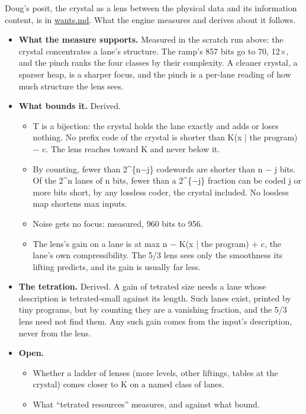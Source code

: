 Doug's posit, the crystal as a lens between the physical data and its information content, is in \hyperref[chap:wants]{wants.md}. What the engine measures and derives about it follows.

\begin{itemize}
\item \textbf{What the measure supports.} Measured in the scratch run above: the crystal concentrates a lane's structure. The ramp's 857 bits go to 70, 12×, and the pinch ranks the four classes by their complexity. A cleaner crystal, a sparser heap, is a sharper focus, and the pinch is a per-lane reading of how much structure the lens sees.
\item \textbf{What bounds it.} Derived.

\begin{itemize}
\item T is a bijection: the crystal holds the lane exactly and adds or loses nothing. No prefix code of the crystal is shorter than K(x | the program) − c. The lens reaches toward K and never below it.
\item By counting, fewer than 2\textasciicircum{}\{n−j\} codewords are shorter than n − j bits. Of the 2\textasciicircum{}n lanes of n bits, fewer than a 2\textasciicircum{}\{−j\} fraction can be coded j or more bits short, by any lossless coder, the crystal included. No lossless map shortens max inputs.
\item Noise gets no focus: measured, 960 bits to 956.
\item The lens's gain on a lane is at max n − K(x | the program) + c, the lane's own compressibility. The 5/3 lens sees only the smoothness its lifting predicts, and its gain is usually far less.
\end{itemize}
\item \textbf{The tetration.} Derived. A gain of tetrated size needs a lane whose description is tetrated-small against its length. Such lanes exist, printed by tiny programs, but by counting they are a vanishing fraction, and the 5/3 lens need not find them. Any such gain comes from the input's description, never from the lens.
\item \textbf{Open.}

\begin{itemize}
\item Whether a ladder of lenses (more levels, other liftings, tables at the crystal) comes closer to K on a named class of lanes.
\item What “tetrated resources” measures, and against what bound.
\end{itemize}
\end{itemize}

